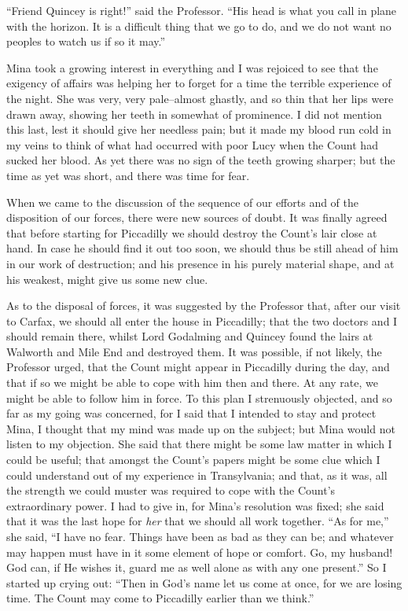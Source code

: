 \documentclass[12pt,openright]{book}
\begin{document}
“Friend Quincey is right!” said the Professor. “His head is what you call in plane with the horizon. It is a difficult thing that we go to do, and we do not want no peoples to watch us if so it may.”

Mina took a growing interest in everything and I was rejoiced to see that the exigency of affairs was helping her to forget for a time the terrible experience of the night. She was very, very pale–almost ghastly, and so thin that her lips were drawn away, showing her teeth in somewhat of prominence. I did not mention this last, lest it should give her needless pain; but it made my blood run cold in my veins to think of what had occurred with poor Lucy when the Count had sucked her blood. As yet there was no sign of the teeth growing sharper; but the time as yet was short, and there was time for fear.

When we came to the discussion of the sequence of our efforts and of the disposition of our forces, there were new sources of doubt. It was finally agreed that before starting for Piccadilly we should destroy the Count’s lair close at hand. In case he should find it out too soon, we should thus be still ahead of him in our work of destruction; and his presence in his purely material shape, and at his weakest, might give us some new clue.

As to the disposal of forces, it was suggested by the Professor that, after our visit to Carfax, we should all enter the house in Piccadilly; that the two doctors and I should remain there, whilst Lord Godalming and Quincey found the lairs at Walworth and Mile End and destroyed them. It was possible, if not likely, the Professor urged, that the Count might appear in Piccadilly during the day, and that if so we might be able to cope with him then and there. At any rate, we might be able to follow him in force. To this plan I strenuously objected, and so far as my going was concerned, for I said that I intended to stay and protect Mina, I thought that my mind was made up on the subject; but Mina would not listen to my objection. She said that there might be some law matter in which I could be useful; that amongst the Count’s papers might be some clue which I could understand out of my experience in Transylvania; and that, as it was, all the strength we could muster was required to cope with the Count’s extraordinary power. I had to give in, for Mina’s resolution was fixed; she said that it was the last hope for \textit{her} that we should all work together. “As for me,” she said, “I have no fear. Things have been as bad as they can be; and whatever may happen must have in it some element of hope or comfort. Go, my husband! God can, if He wishes it, guard me as well alone as with any one present.” So I started up crying out: “Then in God’s name let us come at once, for we are losing time. The Count may come to Piccadilly earlier than we think.”
\end{document}
